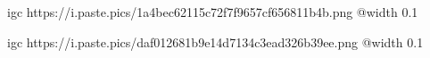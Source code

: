  
 
 
 
 

\qqSecCmt


\ifcmt
  igc https://i.paste.pics/1a4bec62115c72f7f9657cf656811b4b.png
	@width 0.1
\fi


\ifcmt
  igc https://i.paste.pics/daf012681b9e14d7134c3ead326b39ee.png
	@width 0.1
\fi
